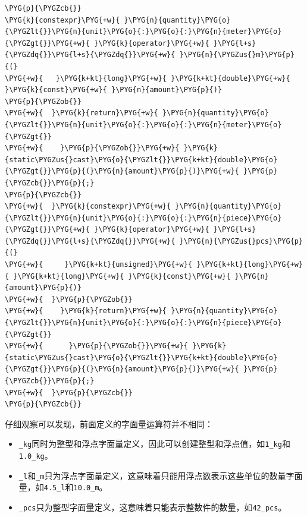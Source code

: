 \begin{itemize}
\begin{codeblockbg}
\begin{Verbatim}[commandchars=\\\{\},breaklines=true,breakanywhere=true,fontsize=\codefont,xleftmargin=17bp]
\PYG{p}{\PYGZcb{}}
\PYG{k}{constexpr}\PYG{+w}{ }\PYG{n}{quantity}\PYG{o}{\PYGZlt{}}\PYG{n}{unit}\PYG{o}{:}\PYG{o}{:}\PYG{n}{meter}\PYG{o}{\PYGZgt{}}\PYG{+w}{ }\PYG{k}{operator}\PYG{+w}{ }\PYG{l+s}{\PYGZdq{}}\PYG{l+s}{\PYGZdq{}}\PYG{+w}{ }\PYG{n}{\PYGZus{}m}\PYG{p}{(}
\PYG{+w}{   }\PYG{k+kt}{long}\PYG{+w}{ }\PYG{k+kt}{double}\PYG{+w}{ }\PYG{k}{const}\PYG{+w}{ }\PYG{n}{amount}\PYG{p}{)}
\PYG{p}{\PYGZob{}}
\PYG{+w}{  }\PYG{k}{return}\PYG{+w}{ }\PYG{n}{quantity}\PYG{o}{\PYGZlt{}}\PYG{n}{unit}\PYG{o}{:}\PYG{o}{:}\PYG{n}{meter}\PYG{o}{\PYGZgt{}}
\PYG{+w}{    }\PYG{p}{\PYGZob{}}\PYG{+w}{ }\PYG{k}{static\PYGZus{}cast}\PYG{o}{\PYGZlt{}}\PYG{k+kt}{double}\PYG{o}{\PYGZgt{}}\PYG{p}{(}\PYG{n}{amount}\PYG{p}{)}\PYG{+w}{ }\PYG{p}{\PYGZcb{}}\PYG{p}{;}
\PYG{p}{\PYGZcb{}}
\PYG{+w}{  }\PYG{k}{constexpr}\PYG{+w}{ }\PYG{n}{quantity}\PYG{o}{\PYGZlt{}}\PYG{n}{unit}\PYG{o}{:}\PYG{o}{:}\PYG{n}{piece}\PYG{o}{\PYGZgt{}}\PYG{+w}{ }\PYG{k}{operator}\PYG{+w}{ }\PYG{l+s}{\PYGZdq{}}\PYG{l+s}{\PYGZdq{}}\PYG{+w}{ }\PYG{n}{\PYGZus{}pcs}\PYG{p}{(}
\PYG{+w}{     }\PYG{k+kt}{unsigned}\PYG{+w}{ }\PYG{k+kt}{long}\PYG{+w}{ }\PYG{k+kt}{long}\PYG{+w}{ }\PYG{k}{const}\PYG{+w}{ }\PYG{n}{amount}\PYG{p}{)}
\PYG{+w}{  }\PYG{p}{\PYGZob{}}
\PYG{+w}{    }\PYG{k}{return}\PYG{+w}{ }\PYG{n}{quantity}\PYG{o}{\PYGZlt{}}\PYG{n}{unit}\PYG{o}{:}\PYG{o}{:}\PYG{n}{piece}\PYG{o}{\PYGZgt{}}
\PYG{+w}{      }\PYG{p}{\PYGZob{}}\PYG{+w}{ }\PYG{k}{static\PYGZus{}cast}\PYG{o}{\PYGZlt{}}\PYG{k+kt}{double}\PYG{o}{\PYGZgt{}}\PYG{p}{(}\PYG{n}{amount}\PYG{p}{)}\PYG{+w}{ }\PYG{p}{\PYGZcb{}}\PYG{p}{;}
\PYG{+w}{  }\PYG{p}{\PYGZcb{}}
\PYG{p}{\PYGZcb{}}
\end{Verbatim}
\end{codeblockbg}

\end{itemize}



仔细观察可以发现，前面定义的字面量运算符并不相同：



\begin{itemize}
\item \texttt{\_\allowbreak{}kg}同时为整型和浮点字面量定义，因此可以创建整型和浮点值，如\texttt{1\_\allowbreak{}kg}和\texttt{1.\allowbreak{}0\_\allowbreak{}kg}。



\item \texttt{\_\allowbreak{}l}和\texttt{\_\allowbreak{}m}只为浮点字面量定义，这意味着只能用浮点数表示这些单位的数量字面量，如\texttt{4.\allowbreak{}5\_\allowbreak{}l}和\texttt{10.\allowbreak{}0\_\allowbreak{}m}。



\item \texttt{\_\allowbreak{}pcs}只为整型字面量定义，这意味着只能表示整数件的数量，如\texttt{42\_\allowbreak{}pcs}。

\end{itemize}


